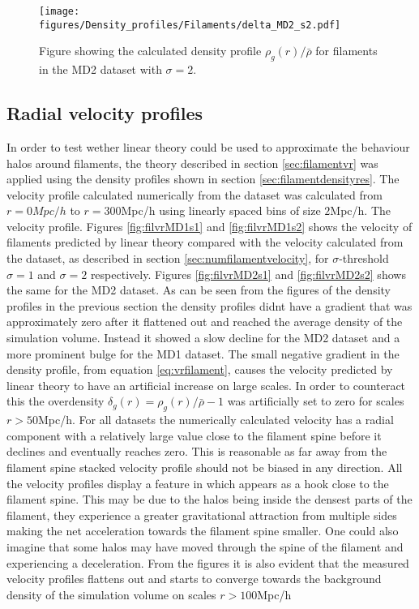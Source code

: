 \begin{figure}[htbp]
    \texttt{[image: figures/Density\_profiles/Filaments/delta\_MD2\_s2.pdf]}
    \caption{Figure showing the calculated density profile $\rho_g(r)/\bar{\rho}$ for filaments in the MD2 dataset with $\sigma=2$.}
    \label{fig:fildensitytMD2s2}
\end{figure}
\subsection{Radial velocity profiles}
In order to test wether linear theory could be used to approximate the behaviour halos around filaments, the theory described in section \ref{sec:filamentvr} was applied using the density profiles shown in section \ref{sec:filamentdensityres}. The velocity profile calculated numerically from the dataset was calculated from $r=0Mpc/h$ to $r=300$Mpc/h using linearly spaced bins of size $2$Mpc/h. The velocity profile. Figures \ref{fig:filvrMD1s1} and \ref{fig:filvrMD1s2} shows the velocity of filaments predicted by linear theory compared with the velocity calculated from the dataset, as described in section \ref{sec:numfilamentvelocity}, for $\sigma$-threshold $\sigma=1$ and $\sigma=2$ respectively. Figures \ref{fig:filvrMD2s1} and \ref{fig:filvrMD2s2} shows the same for the MD2 dataset. As can be seen from the figures of the density profiles in the previous section the density profiles didnt have a gradient that was approximately zero after it flattened out and reached the average density of the simulation volume. Instead it showed a slow decline for the MD2 dataset and a more prominent bulge for the MD1 dataset. The small negative gradient in the density profile, from equation \ref{eq:vrfilament}, causes the velocity predicted by linear theory to have an artificial increase on large scales. In order to counteract this the overdensity $\delta_g(r)=\rho_g(r)/\bar{\rho}-1$ was artificially set to zero for scales $r>50$Mpc/h. For all datasets the numerically calculated velocity has a radial component with a relatively large value close to the filament spine before it declines and eventually reaches zero. This is reasonable as far away from the filament spine stacked velocity profile should not be biased in any direction. All the velocity profiles display a feature in which appears as a hook close to the filament spine. This may be due to the halos being inside the densest parts of the filament, they experience a greater gravitational attraction from multiple sides making the net acceleration towards the filament spine smaller. One could also imagine that some halos may have moved through the spine of the filament and experiencing a deceleration. From the figures it is also evident that the measured velocity profiles flattens out and starts to converge towards the background density of the simulation volume on scales $r>100$Mpc/h \\\indent
